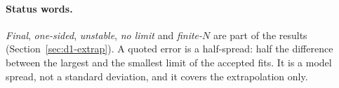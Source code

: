 \paragraph{Status words.} \emph{Final}, \emph{one-sided}, \emph{unstable}, \emph{no limit} and \emph{finite-$N$}
are part of the results (Section~\ref{sec:d1-extrap}). A quoted error is a half-spread: half the difference between
the largest and the smallest limit of the accepted fits. It is a model spread, not a standard deviation, and it
covers the extrapolation only.
